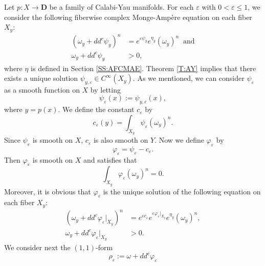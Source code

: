 \documentclass{amsart}
\theoremstyle{definition}
\numberwithin{equation}{section}
\begin{document}
Let $p:X\rightarrow{\mathbf{D}}$ be a family of Calabi-Yau manifolds. For each ${\varepsilon}$ with $0<{\varepsilon}\le1$, we consider the following fiberwise complex Monge-Amp\`ere equation on each fiber $X_y$:
\begin{equation}\label{E:PDE1'}
\begin{aligned}
{\left({\omega_y+dd^c\psi_y}\right)}^n
&=
e^{\varepsilon\psi_y}e^{\eta_y}(\omega_y)^n
\;\;\text{and}
\\
\omega_y+dd^c\psi_y
&>0,
\end{aligned}
\end{equation}
where $\eta$ is defined in Section \ref{SS:AFCMAE}.
Theorem \ref{T:AY} implies that there exists a unique solution $\psi_{y,{\varepsilon}}\in C^\infty(X_y)$. As we mentioned, we can consider $\psi_{\varepsilon}$ as a smooth function on $X$ by letting
\begin{equation*}
\psi_{\varepsilon}(x):=\psi_{y,{\varepsilon}}(x),
\end{equation*}
where $y=p(x)$. 
We define the constant $c_\varepsilon$ by
\begin{equation*}
c_\varepsilon(y)=\int_{X_y}\psi_{\varepsilon}(\omega_y)^n.
\end{equation*}
Since $\psi_\varepsilon$ is smooth on $X$, $c_\varepsilon$ is also smooth on $Y$. Now we define $\varphi_\varepsilon$ by
\begin{equation*}
\varphi_\varepsilon
=
\psi_\varepsilon-c_\varepsilon.
\end{equation*}
Then ${\varphi}_{\varepsilon}$ is smooth on $X$ and satisfies that
\begin{equation*}
\int_{X_y}\varphi_{\varepsilon}(\omega_y)^n=0.
\end{equation*}
Moreover, it is obvious that ${\varphi}_{\varepsilon}$ is the unique solution of the following equation on each fiber $X_y$:
\begin{equation}\label{E:PDE1}
\begin{aligned}
{\left({\omega_y+dd^c{\varphi}_{\varepsilon}\vert_{X_y}}\right)}^n
&=
e^{{\varepsilon} c_{\varepsilon}}e^{{\varepsilon}{\varphi}_{\varepsilon}\vert_{X_y}}e^{\eta_y}(\omega_y)^n, 
\\
\omega_y+dd^c{\varphi}_{\varepsilon}\vert_{X_y}
&>0.
\end{aligned}
\end{equation}
We consider next the $(1,1)$-form
\begin{equation} \label{E:rho}
\rho_\varepsilon
	:=\omega+dd^c\varphi_\varepsilon
\end{equation}
\end{document}
